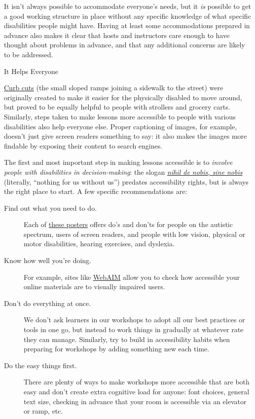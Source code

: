 It isn't always possible to accommodate everyone's needs, but it \emph{is}
possible to get a good working structure in place without any specific
knowledge of what specific disabilities people might have. Having at
least some accommodations prepared in advance also makes it clear that
hosts and instructors care enough to have thought about problems in
advance, and that any additional concerns are likely to be addressed.

\begin{aside}{It Helps Everyone}

\href{https://en.wikipedia.org/wiki/Curb\_cut}{Curb cuts} (the small sloped ramps joining a sidewalk to
the street) were originally created to make it easier for the
physically disabled to move around, but proved to be equally helpful
to people with strollers and grocery carts. Similarly, steps taken
to make lessons more accessible to people with various disabilities
also help everyone else. Proper captioning of images, for example,
doesn't just give screen readers something to say: it also makes the
images more findable by exposing their content to search engines.

\end{aside}

The first and most important step in making lessons accessible is to
\emph{involve people with disabilities in decision-making}: the slogan
\emph{\href{https://en.wikipedia.org/wiki/Nothing\_About\_Us\_Without\_Us}{nihil de nobis, sine nobis}} (literally, ``nothing
for us without us'') predates accessibility rights, but is always the
right place to start. A few specific recommendations are:

\begin{description}
\item[Find out what you need to do.]
Each of \href{https://accessibility.blog.gov.uk/2016/09/02/dos-and-donts-on-designing-for-accessibility/}{these posters} offers do's and
don'ts for people on the autistic spectrum, users of screen readers,
and people with low vision, physical or motor disabilities, hearing
exercises, and dyslexia.
\item[Know how well you're doing.]
For example, sites like \href{http://webaim.org/}{WebAIM} allow you to check how
accessible your online materials are to visually impaired users.
\item[Don't do everything at once.]
We don't ask learners in our workshops to adopt all our best
practices or tools in one go, but instead to work things in
gradually at whatever rate they can manage. Similarly, try to build
in accessibility habits when preparing for workshops by adding
something new each time.
\item[Do the easy things first.]
There are plenty of ways to make workshops more accessible that are
both easy and don't create extra cognitive load for anyone: font
choices, general text size, checking in advance that your room is
accessible via an elevator or ramp, etc.
\end{description}

